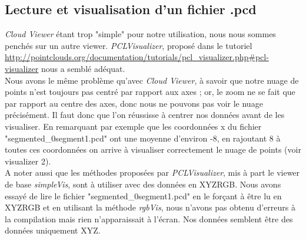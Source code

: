 \subsection{Lecture et visualisation d'un fichier .pcd}

\emph{Cloud Viewer} étant trop "simple" pour notre utilisation, nous nous sommes penchés sur un autre viewer. \emph{PCLVisualizer}, proposé dans le tutoriel \url{http://pointclouds.org/documentation/tutorials/pcl_visualizer.php#pcl-visualizer} nous a semblé adéquat. \\

Nous avons le même problème qu'avec \emph{Cloud Viewer}, à savoir que notre nuage de points n'est toujours pas centré par rapport aux axes ; or, le zoom ne se fait que par rapport au centre des axes, donc nous ne pouvons pas voir le nuage précisément. Il faut donc que l'on réussisse à centrer nos données avant de les visualiser. En remarquant par exemple que les coordonnées x du fichier "segmented\_0segment1.pcd" ont une moyenne d'environ -8, en rajoutant 8 à toutes ces coordonnées on arrive à visualiser correctement le nuage de points (voir visualizer 2). \\

A noter aussi que les méthodes proposées par \emph{PCLVisualizer}, mis à part le viewer de base \textit{simpleVis}, sont à utiliser avec des données en XYZRGB. Nous avons essayé de lire le fichier "segmented\_0segment1.pcd" en le forçant à être lu en XYZRGB et en utilisant la méthode \textit{rgbVis}, nous n'avons pas obtenu d'erreurs à la compilation mais rien n'apparaissait à l'écran. Nos données semblent être des données uniquement XYZ. \\
